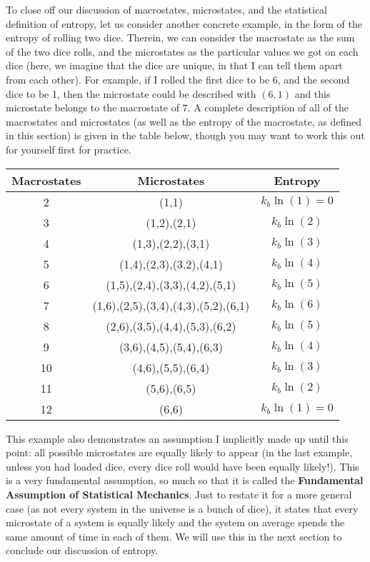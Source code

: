 To close off our discussion of macrostates, microstates, and the statistical definition of entropy, let us consider another concrete example, in the form of the entropy of rolling two dice. Therein, we can consider the macrostate as the sum of the two dice rolls, and the microstates as the particular values we got on each dice (here, we imagine that the dice are unique, in that I can tell them apart from each other). For example, if I rolled the first dice to be 6, and the second dice to be 1, then the microstate could be described with $(6,1)$ and this microstate belongs to the macrostate of $7$. A complete description of all of the macrostates and microstates (as well as the entropy of the macrostate, as defined in this section) is given in the table below, though you may want to work this out for yourself first for practice.

\begin{center}
 \begin{tabular}{|c c c|} 
 \hline
 \textbf{Macrostates} & \textbf{Microstates} & \textbf{Entropy}\\ 
 \hline\hline
 2 & (1,1) & $k_b\ln(1) = 0$\\ 
 \hline
 3 & (1,2),(2,1) & $k_b\ln(2)$ \\
 \hline
 4 & (1,3),(2,2),(3,1) & $k_b\ln(3)$ \\
 \hline
 5 & (1,4),(2,3),(3,2),(4,1) & $k_b\ln(4)$ \\
 \hline
 6 & (1,5),(2,4),(3,3),(4,2),(5,1) & $k_b\ln(5)$ \\
 \hline
 7 & (1,6),(2,5),(3,4),(4,3),(5,2),(6,1) & $k_b\ln(6)$\\
 \hline
 8 & (2,6),(3,5),(4,4),(5,3),(6,2) & $k_b\ln(5)$\\
 \hline
 9 & (3,6),(4,5),(5,4),(6,3) & $k_b\ln(4)$\\
 \hline
 10 & (4,6),(5,5),(6,4) & $k_b\ln(3)$\\
 \hline
 11 & (5,6),(6,5) & $k_b\ln(2)$\\
 \hline
 12 & (6,6) & $k_b\ln(1) = 0$\\
 \hline
\end{tabular}
\end{center}
This example also demonstrates an assumption I implicitly made up until this point: all possible microstates are equally likely to appear (in the last example, unless you had loaded dice, every dice roll would have been equally likely!). This is a very fundamental assumption, so much so that it is called the \textbf{Fundamental Assumption of Statistical Mechanics}. Just to restate it for a more general case (as not every system in the universe is a bunch of dice), it states that every microstate of a system is equally likely and the system on average spends the same amount of time in each of them. We will use this in the next section to conclude our discussion of entropy. 